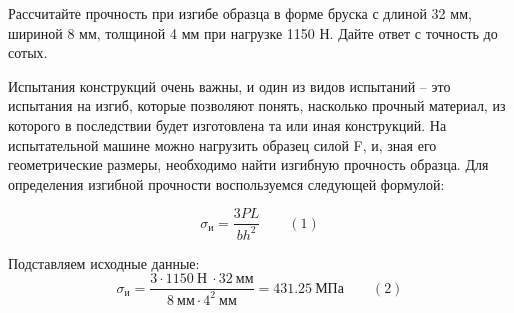 
Рассчитайте прочность при изгибе образца в форме бруска с длиной 32 мм, шириной 8 мм, толщиной 4 мм при нагрузке 1150 Н. Дайте ответ с точность до сотых.

\explanationSection

Испытания конструкций очень важны, и один из видов испытаний – это испытания на изгиб, которые позволяют понять, насколько прочный материал, из которого в последствии будет изготовлена та или иная конструкций. На испытательной машине можно нагрузить образец силой F, и, зная его геометрические размеры, необходимо найти изгибную прочность образца.
Для определения изгибной прочности воспользуемся следующей формулой:

$$\sigma_\text{и}=\frac{3PL}{bh^2} \qquad (1)$$

Подставляем исходные данные:
$$\sigma_\text{и}=\frac{3\cdot 1150 \: \text{Н} \: \cdot 32 \: \text{мм}}{8 \: \text{мм}\cdot 4^2  \: \text{мм}}=431.25 \: \text{МПа} \qquad (2)$$

